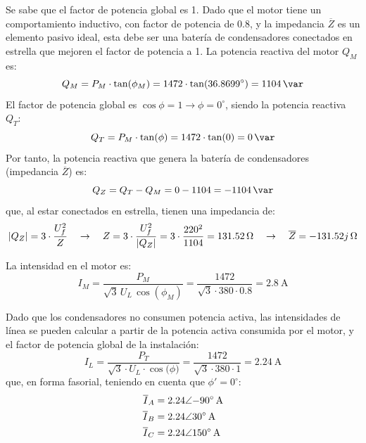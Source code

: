Se sabe que el factor de potencia global es 1. Dado que el motor tiene
un comportamiento inductivo, con factor de potencia de $0.8$, y la
impedancia $\overline{Z}$ es un elemento pasivo ideal, {esta debe ser
  una batería de condensadores} conectados en estrella que mejoren el
factor de potencia a 1. La potencia reactiva del motor $Q_M$ es:
\begin{equation*}
  Q_M=P_M\cdot \tan(\phi_M)=1472\cdot \tan(36.8699^\circ)=\qty{1104}{\var}
\end{equation*}
El factor de potencia global es $\cos{\phi}=1\rightarrow\phi=0^\circ$,
siendo la potencia reactiva $Q_T$:
\begin{equation*}
  Q_T=P_M\cdot \tan(\phi)=1472\cdot \tan(0)=\qty{0}{\var}
\end{equation*}
Por tanto, la potencia reactiva que genera la batería de condensadores
(impedancia $\overline{Z}$) es:
\begin{equation*}
  Q_Z=Q_T-Q_M=0-1104=\qty{-1104}{\var}
\end{equation*}
que, al estar conectados en estrella, tienen una impedancia de:
\begin{equation*}
  |Q_Z|=3\cdot \dfrac{U_f^2}{Z} \quad\rightarrow\quad Z=3\cdot \dfrac{U_f^2}{|Q_Z|}=3\cdot \dfrac{220^2}{1104}=\qty{131.52}{\ohm} \quad\rightarrow\quad \overline{Z}=\complexqty{-131.52j}{\ohm}
\end{equation*}

La intensidad en el motor es:
\begin{equation*}
  I_M=\dfrac{P_M}{\sqrt{3}\,U_L\,\cos(\phi_M)}=\dfrac{1472}{\sqrt{3}\cdot 380\cdot 0.8}= \qty{2.8}{\ampere}
\end{equation*}

Dado que los condensadores no consumen potencia activa, las
intensidades de línea se pueden calcular a partir de la potencia
activa consumida por el motor, y el factor de potencia global de la
instalación:
\begin{equation*}
  I_L=\dfrac{P_T}{\sqrt{3}\cdot U_L\cdot \cos{(\phi})}=\dfrac{1472}{\sqrt{3}\cdot 380\cdot 1}=\qty{2.24}{\ampere}
\end{equation*}
que, en forma fasorial, teniendo en cuenta que $\phi'=0^\circ$:
\begin{align*}
  \overline{I}_{A}&=\complexqty{2.24:-90}{\ampere}\\
  \overline{I}_{B}&=\complexqty{2.24:30}{\ampere}\\
  \overline{I}_{C}&=\complexqty{2.24:150}{\ampere}\\
\end{align*}

